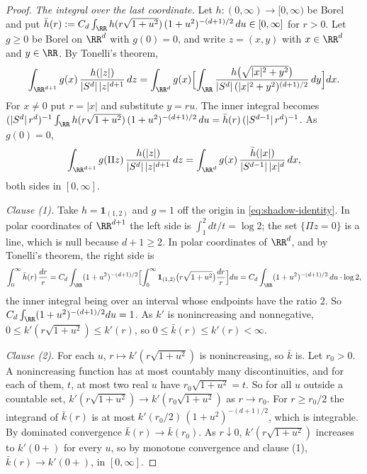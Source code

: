 \begin{proof}
\leanok
\emph{The integral over the last coordinate.} Let $h : (0,\infty) \to [0,\infty)$ be Borel and
put $\bar h(r) := C_d\int_{\RR}h(r\sqrt{1+u^2})\,(1+u^2)^{-(d+1)/2}\,du \in [0,\infty]$ for
$r > 0$. Let $g \ge 0$ be Borel on $\RR^d$ with $g(0) = 0$, and write $z = (x,y)$ with
$x \in \RR^d$ and $y \in \RR$. By Tonelli's theorem,
\[
  \int_{\RR^{d+1}} g(x)\,\frac{h(|z|)}{|S^{d}|\,|z|^{d+1}}\,dz
   = \int_{\RR^d} g(x)\Bigl[\int_{\RR}
       \frac{h\bigl(\sqrt{|x|^2+y^2}\bigr)}{|S^{d}|\,(|x|^2+y^2)^{(d+1)/2}}\,dy\Bigr]dx .
\]
For $x \ne 0$ put $r = |x|$ and substitute $y = ru$. The inner integral becomes
$(|S^{d}|\,r^{d})^{-1}\int_{\RR}h(r\sqrt{1+u^2})\,(1+u^2)^{-(d+1)/2}\,du =
\bar h(r)\,(|S^{d-1}|\,r^{d})^{-1}$. As $g(0) = 0$,
\begin{equation}\label{eq:shadow-identity}
  \int_{\RR^{d+1}} g(\Pi z)\,\frac{h(|z|)}{|S^{d}|\,|z|^{d+1}}\,dz
   = \int_{\RR^d} g(x)\,\frac{\bar h(|x|)}{|S^{d-1}|\,|x|^{d}}\,dx ,
\end{equation}
both sides in $[0,\infty]$.

\emph{Clause (1).} Take $h = \mathbf 1_{(1,2)}$ and $g = 1$ off the origin in
\ref{eq:shadow-identity}. In polar coordinates of $\RR^{d+1}$ the left side is
$\int_1^2 dt/t = \log 2$; the set $\{\Pi z = 0\}$ is a line, which is null because $d + 1 \ge 2$.
In polar coordinates of $\RR^d$, and by Tonelli's theorem, the right side is
\[
  \int_0^\infty \bar h(r)\,\frac{dr}{r}
   = C_d\int_{\RR}(1+u^2)^{-(d+1)/2}\Bigl[\int_0^\infty
       \mathbf 1_{(1,2)}\bigl(r\sqrt{1+u^2}\bigr)\frac{dr}{r}\Bigr]du
   = C_d\int_{\RR}(1+u^2)^{-(d+1)/2}\,du\cdot\log 2 ,
\]
the inner integral being over an interval whose endpoints have the ratio $2$. So
$C_d\int_{\RR}(1+u^2)^{-(d+1)/2}du = 1$. As $k'$ is nonincreasing and nonnegative,
$0 \le k'(r\sqrt{1+u^2}) \le k'(r)$, so $0 \le \bar k(r) \le k'(r) < \infty$.

\emph{Clause (2).} For each $u$, $r \mapsto k'(r\sqrt{1+u^2})$ is nonincreasing, so $\bar k$ is.
Let $r_0 > 0$. A nonincreasing function has at most countably many discontinuities, and for each
of them, $t$, at most two real $u$ have $r_0\sqrt{1+u^2} = t$. So for all $u$ outside a countable
set, $k'(r\sqrt{1+u^2}) \to k'(r_0\sqrt{1+u^2})$ as $r \to r_0$. For $r \ge r_0/2$ the integrand
of $\bar k(r)$ is at most $k'(r_0/2)\,(1+u^2)^{-(d+1)/2}$, which is integrable. By dominated
convergence $\bar k(r) \to \bar k(r_0)$. As $r \downarrow 0$, $k'(r\sqrt{1+u^2})$ increases to
$k'(0{+})$ for every $u$, so by monotone convergence and clause (1),
$\bar k(r) \to k'(0{+})$, in $[0,\infty]$.


\end{proof}

